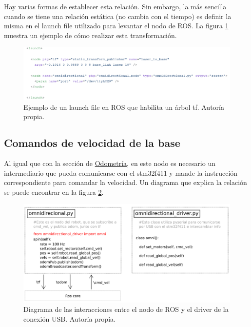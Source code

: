 Hay varias formas de establecer esta relación. Sin embargo, la más sencilla cuando se tiene una relación estática (no cambia con el tiempo) es definir la misma en el launch file utilizado para levantar el nodo de ROS. La figura \ref{F:launchfile} muestra un ejemplo de cómo realizar esta transformación.

\begin{figure}[H]
\centering
\includegraphics[scale=0.4]{imagenes/launch_file.png}
\caption{Ejemplo de un launch file en ROS que habilita un árbol tf. Autoría propia.}
\label{F:launchfile}
\end{figure}

\subsection{Comandos de velocidad de la base}

Al igual que con la sección de \hyperref[seccionodometria]{Odometría}, en este nodo es necesario un intermediario que pueda comunicarse con el stm32f411 y mande la instrucción correspondiente para comandar la velocidad. Un diagrama que explica la relación se puede encontrar en la figura \ref{F:rosnode}.

\begin{figure}[H]
\centering
\includegraphics[scale=0.4]{imagenes/diagrama_rosnode.png}
\caption{Diagrama de las interacciones entre el nodo de ROS y el driver de la conexión USB. Autoría propia.}
\label{F:rosnode}
\end{figure}

